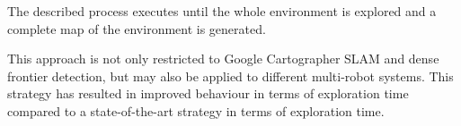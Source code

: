 The described process executes until the whole environment is explored and a complete  map of the environment is generated.

This approach is not only restricted to Google Cartographer SLAM and dense frontier detection, but may also be applied to different multi-robot systems. This strategy has resulted in improved behaviour in terms of exploration time compared to a state-of-the-art strategy in terms of exploration time. 



